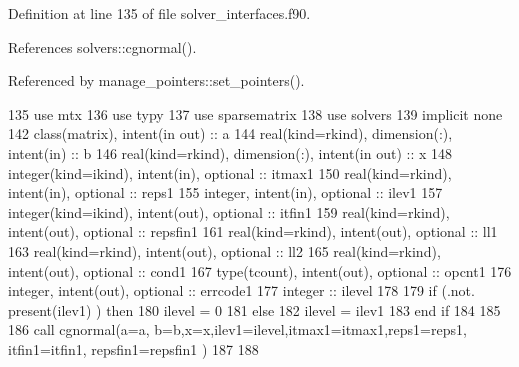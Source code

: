 Definition at line 135 of file solver\+\_\+interfaces.\+f90.



References solvers\+::cgnormal().



Referenced by manage\+\_\+pointers\+::set\+\_\+pointers().


\begin{DoxyCode}
135         \textcolor{keywordtype}{use }mtx
136         \textcolor{keywordtype}{use }typy
137         \textcolor{keywordtype}{use }sparsematrix
138         \textcolor{keywordtype}{use }solvers
139         \textcolor{keywordtype}{implicit none}
142         \textcolor{keywordtype}{class}(matrix), \textcolor{keywordtype}{intent(in out)} :: a
144         \textcolor{keywordtype}{real(kind=rkind)}, \textcolor{keywordtype}{dimension(:)}, \textcolor{keywordtype}{intent(in)} :: b
146         \textcolor{keywordtype}{real(kind=rkind)}, \textcolor{keywordtype}{dimension(:)}, \textcolor{keywordtype}{intent(in out)} :: x
148         \textcolor{keywordtype}{integer(kind=ikind)}, \textcolor{keywordtype}{intent(in)}, \textcolor{keywordtype}{optional} :: itmax1
150         \textcolor{keywordtype}{real(kind=rkind)}, \textcolor{keywordtype}{intent(in)}, \textcolor{keywordtype}{optional} :: reps1
155         \textcolor{keywordtype}{integer}, \textcolor{keywordtype}{intent(in)}, \textcolor{keywordtype}{optional} :: ilev1
157         \textcolor{keywordtype}{integer(kind=ikind)}, \textcolor{keywordtype}{intent(out)}, \textcolor{keywordtype}{optional} :: itfin1
159         \textcolor{keywordtype}{real(kind=rkind)}, \textcolor{keywordtype}{intent(out)}, \textcolor{keywordtype}{optional} :: repsfin1
161         \textcolor{keywordtype}{real(kind=rkind)}, \textcolor{keywordtype}{intent(out)}, \textcolor{keywordtype}{optional} :: ll1
163         \textcolor{keywordtype}{real(kind=rkind)}, \textcolor{keywordtype}{intent(out)}, \textcolor{keywordtype}{optional} :: ll2
165         \textcolor{keywordtype}{real(kind=rkind)}, \textcolor{keywordtype}{intent(out)}, \textcolor{keywordtype}{optional} :: cond1
167         \textcolor{keywordtype}{type}(tcount), \textcolor{keywordtype}{intent(out)}, \textcolor{keywordtype}{optional} :: opcnt1
176         \textcolor{keywordtype}{integer}, \textcolor{keywordtype}{intent(out)}, \textcolor{keywordtype}{optional} :: errcode1
177         \textcolor{keywordtype}{integer} :: ilevel
178 
179         \textcolor{keywordflow}{if} (.not. \textcolor{keyword}{present}(ilev1) ) \textcolor{keywordflow}{then}
180           ilevel = 0
181         \textcolor{keywordflow}{else}
182           ilevel = ilev1
183 \textcolor{keywordflow}{        end if}
184 
185 
186         \textcolor{keyword}{call }cgnormal(a=a, b=b,x=x,ilev1=ilevel,itmax1=itmax1,reps1=reps1, itfin1=itfin1, repsfin1=repsfin1
      )
187 
188 
\end{DoxyCode}


